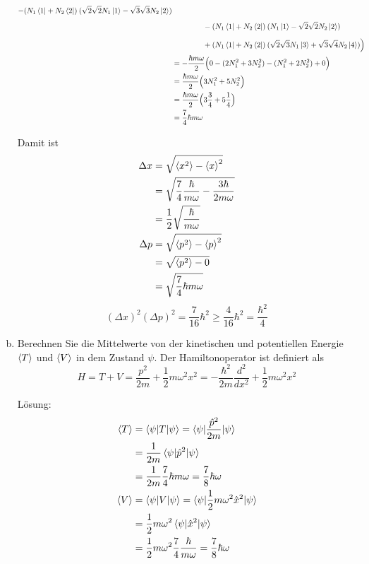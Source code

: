 \documentclass{scrartcl}
\begin{document}
\begin{enumerate}[a)]
\begin{align*}
					- (N_1 \bra 1 + N_2 \bra 2)\: (\sqrt 2 \sqrt 2 N_1\ket 1 - \sqrt 3 \sqrt 3  N_2\ket 2) \\
				&\phantom{=\frac 12 \frac{\hbar}{m\omega} \Big(}
					- (N_1 \bra 1 + N_2 \bra 2)\: (N_1\ket 1 - \sqrt 2 \sqrt 2 N_2\ket 2) \\
				&\phantom{=\frac 12 \frac{\hbar}{m\omega} \Big(}
					+ (N_1 \bra 1 + N_2 \bra 2)\:(\sqrt 2 \sqrt 3 N_1\ket 3 + \sqrt  3 \sqrt 4 N_2\ket 4) \Big)\\		
				&=  -\frac{\hbar m \omega}{2}  \Big(
					0 -(2N_1^2 + 3 N_2^2) - (N_1^2 + 2 N_2^2) + 0
				\Big)\\	
				&= \frac{\hbar m \omega}{2}  \Big( 3N_1^2 + 5 N_2^2 \Big)\\
				&= \frac{\hbar m \omega}{2} \Big( 3\frac{3}{4} + 5 \frac{1}{4} \Big) \\
				&= \frac 74 \hbar m \omega \\
\end{align*}

Damit ist 
\begin{align*}
\Delta x	&= \sqrt{\braket{x^2}-\braket{x}^2}	\\
			&= \sqrt{\frac 74 \frac{\hbar}{m\omega} - \frac{3\hbar}{2m\omega}} \\
			&= \frac{1}{2}\sqrt{\frac{\hbar}{m\omega}} \\
\Delta p	&= \sqrt{\braket{p^2}-\braket{p}^2}	\\
			&= \sqrt{\braket{p^2}-0}	\\
			&= \sqrt{\frac 74 \hbar m \omega}
\end{align*}
\[(\Delta x)^2 (\Delta p)^2 = \frac{7}{16}\hbar^2 \geq \frac{4}{16}\hbar^2 = \frac{\hbar^2}{4}\]


\item Berechnen Sie die Mittelwerte von der kinetischen und potentiellen Energie $\braket{T}$ und $\braket{V}$ in dem Zustand $\psi$. Der Hamiltonoperator ist definiert als
\[H=T+V=\frac{p^2}{2m}+\frac{1}{2}m\omega^2x^2=-\frac{\hbar^2}{2m}\frac{d^2}{dx^2}+\frac{1}{2}m\omega^2 x^2\]

\item[Lösung:]
\begin{align*}
\braket{T} 	&= \braket{\psi|T|\psi} = \braket{\psi|\frac{\hat p^2}{2m}|\psi}	\\
			&= \frac{1}{2m}\braket{\psi|\hat p^2|\psi}\\
			&= \frac{1}{2m} \frac{7}{4} \hbar m \omega = \frac 78 \hbar \omega\\
\braket{V} 	&= \braket{\psi|V|\psi} = \braket{\psi|\frac 12 m\omega^2 \hat x^2|\psi}	\\
			&= \frac 12 m\omega^2 \braket{\psi|\hat x^2|\psi}\\
			&= \frac 12 m\omega^2 \frac 74 \frac{\hbar}{m\omega} = \frac 78 \hbar \omega			
\end{align*}

\end{enumerate}
\end{document}
